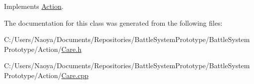 Implements \hyperlink{class_action_aac84ff5e2103bbe0067df14b4a302a1d}{Action}.



The documentation for this class was generated from the following files\+:\begin{DoxyCompactItemize}
\item 
C\+:/\+Users/\+Naoya/\+Documents/\+Repositories/\+Battle\+System\+Prototype/\+Battle\+System\+Prototype/\+Action/\hyperlink{_care_8h}{Care.\+h}\item 
C\+:/\+Users/\+Naoya/\+Documents/\+Repositories/\+Battle\+System\+Prototype/\+Battle\+System\+Prototype/\+Action/\hyperlink{_care_8cpp}{Care.\+cpp}\end{DoxyCompactItemize}
